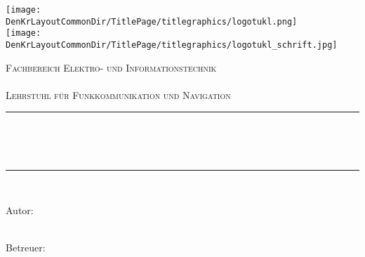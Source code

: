 
\newcommand{\HRule}{\rule{\linewidth}{0.5mm}}


\begin{titlepage}

\begin{center}


\begin{minipage}{0.3\textwidth}
\begin{flushleft}
\texttt{[image: \\DenKrLayoutCommonDir/TitlePage/titlegraphics/logotukl.png]}\\
\texttt{[image: \\DenKrLayoutCommonDir/TitlePage/titlegraphics/logotukl\_schrift.jpg]}\\
\textsc{\Large }
\end{flushleft}
\end{minipage}
\hfill
\begin{minipage}{0.5\textwidth}
\begin{flushright}
\textsc{\Large Fachbereich Elektro- und Informationstechnik}\\
\textsc{ }\\
\textsc{\Large Lehrstuhl für Funkkommunikation und Navigation}
\end{flushright}
\end{minipage}

\vspace{0.07\textheight}

\begin{spacing}{1.2}
\textsc{\LARGE\DenKrTPpublicationType}
\end{spacing}

\vspace{0.02\textheight}


\HRule \\[0.2\baselineskip]
\begin{spacing}{1}
\huge\bfseries
\DenKrTPtitle
\\[0\baselineskip]
\end{spacing}
\HRule \\[0.08\textheight]

\begin{minipage}[t]{0.4\textwidth}
\begin{flushleft} \large
{Autor:}\\
\DenKrTPauthorFirst\ \textsc{\DenKrTPauthorLast}
\end{flushleft}
\end{minipage}
\hfill
\begin{minipage}[t]{0.4\textwidth}
\begin{flushright} \large
{Betreuer:}\\
\DenKrTPsupervisorOneAnrede\
\DenKrTPsupervisorOneFirst\ \textsc{\DenKrTPsupervisorOneLast}\\
\DenKrTPsupervisorTwoAnrede\
\DenKrTPsupervisorTwoFirst\ \textsc{\DenKrTPsupervisorTwoLast}
\end{flushright}
\end{minipage}


\end{center}
\end{titlepage}
